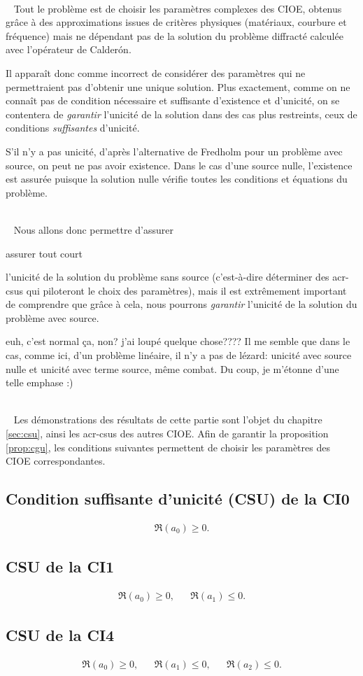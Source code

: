   {~}\\{~}
  Tout le problème est de choisir les paramètres complexes des CIOE, obtenus grâce à des approximations issues de critères physiques (matériaux, courbure et fréquence) mais ne dépendant pas de la solution du problème diffracté calculée avec l'opérateur de Calderón. 

  Il apparaît donc comme incorrect de considérer des paramètres qui ne permettraient pas d'obtenir une unique solution.
  Plus exactement, comme on ne connaît pas de condition nécessaire et suffisante d'existence et d'unicité, on se contentera de \emph{garantir} l'unicité de la solution dans des cas plus restreints, ceux de conditions \emph{suffisantes} d'unicité.

  S'il n'y a pas unicité, d'après l'alternative de Fredholm pour un problème avec source, on peut ne pas avoir existence.
  Dans le cas d'une source nulle, l'existence est assurée puisque la solution nulle vérifie toutes les conditions et équations du problème.

  {~}\\{~}
  Nous allons donc permettre d'assurer
  \begin{REM}
  assurer tout court
\end{REM} l'unicité de la solution du problème sans source (c'est-à-dire déterminer des \glspl{acr-csu} qui piloteront le choix des paramètres), mais il est extrêmement important de comprendre que grâce à cela, nous pourrons \emph{garantir} l'unicité de la solution du problème avec source.
\begin{REM}
  euh, c'est normal ça, non? j'ai loupé quelque chose???? Il me semble que dans le cas, comme ici, d'un problème linéaire, il n'y a pas de lézard: unicité avec source nulle et unicité avec terme source, même combat. Du coup, je m'étonne d'une telle emphase :)
\end{REM}
  {~}\\{~}
  Les démonstrations des résultats de cette partie sont l'objet du chapitre \ref{sec:csu}, ainsi les \glspl{acr-csu} des autres CIOE.
  Afin de garantir la proposition \ref{prop:cgu}, les conditions suivantes permettent de choisir les paramètres des CIOE correspondantes.

  \subsection{Condition suffisante d'unicité (CSU) de la CI0}
    \begin{align*}
      \Re(a_0) \ge 0.
    \end{align*}
  
  \subsection{CSU de la CI1}
    \begin{align*}
      \Re(a_0) \ge 0,&& \Re(a_1) \le 0.
    \end{align*}

  \subsection{CSU de la CI4}
    \begin{align*}
      \Re(a_0) \ge 0,&& \Re(a_1) \le 0,&& \Re(a_2) \le 0.
    \end{align*}

